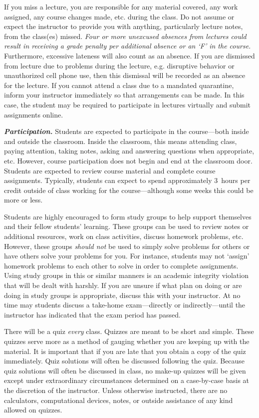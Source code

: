 \documentclass[11pt,letterpaper]{article}
\begin{document}
If you miss a lecture, you are responsible for any material covered, any work assigned, any course changes made, etc. during the class. Do not assume or expect the instructor to provide you with anything, particularly lecture notes, from the class(es) missed. {\itshape Four or more unexcused absences from lectures could result in receiving a grade penalty per additional absence or an `F' in the course.} Furthermore, excessive lateness will also count as an absence. If you are dismissed from lecture due to problems during the lecture, e.g. disruptive behavior or unauthorized cell phone use, then this dismissal will be recorded as an absence for the lecture. If you cannot attend a class due to a mandated quarantine, inform your instructor immediately so that arrangements can be made. In this case, the student may be required to participate in lectures virtually and submit assignments online. \pspace

{\itshape\bfseries\color{stacred}Participation.} 
Students are expected to participate in the course---both inside and outside the classroom. Inside the classroom, this means attending class, paying attention, taking notes, asking and answering questions when appropriate, etc. However, course participation does not begin and end at the classroom door. Students are expected to review course material and complete course assignments. Typically, students can expect to spend approximately 3~hours per credit outside of class working for the course---although some weeks this could be more or less. \pspace

Students are highly encouraged to form study groups to help support themselves and their fellow students' learning. These groups can be used to review notes or additional resources, work on class activities, discuss homework problems, etc. However, these groups {\itshape should not} be used to simply solve problems for others or have others solve your problems for you. For instance, students may not `assign' homework problems to each other to solve in order to complete assignments. Using study groups in this or similar manners is an academic integrity violation that will be dealt with harshly. If you are unsure if what plan on doing or are doing in study groups is appropriate, discuss this with your instructor. At no time may students discuss a take-home exam---directly or indirectly---until the instructor has indicated that the exam period has passed. \sectionbreak



There will be a quiz \textit{every} class. Quizzes are meant to be short and simple. These quizzes serve more as a method of gauging whether you are keeping up with the material. It is important that if you are late that you obtain a copy of the quiz immediately. Quiz solutions will often be discussed following the quiz. Because quiz solutions will often be discussed in class, no make-up quizzes will be given except under extraordinary circumstances determined on a case-by-case basis at the discretion of the instructor. Unless otherwise instructed, there are no calculators, computational devices, notes, or outside assistance of any kind allowed on quizzes. \pspace
\end{document}
